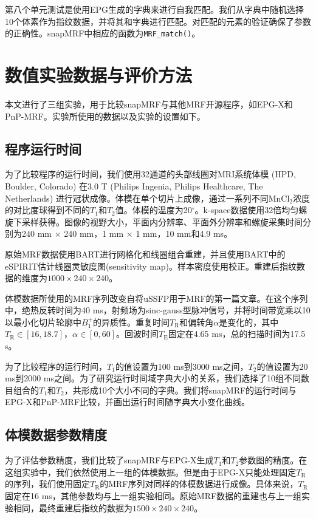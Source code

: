 第八个单元测试是使用EPG生成的字典来进行自我匹配。我们从字典中随机选择10个体素作为指纹数据，并将其和字典进行匹配。对匹配的元素的验证确保了参数的正确性。snapMRF中相应的函数为\texttt{MRF\_match()}。

\section{数值实验数据与评价方法}
本文进行了三组实验，用于比较snapMRF与其他MRF开源程序，如EPG-X和PnP-MRF。实验所使用的数据以及实验的设置如下。

\subsection{程序运行时间}
为了比较程序的运行时间，我们使用32通道的头部线圈对MRI系统体模 \cite{keenan_comparison_2016} (HPD, Boulder, Colorado) 在3.0 T (Philips Ingenia, Philips Healthcare, The Netherlands) 进行冠状成像。体模在单个切片上成像，通过一系列不同MnCl$_2$浓度的对比度球得到不同的$T_1$和$T_2$值。体模的温度为20$^{\circ}$。k-space数据使用32倍均匀螺旋下采样获得\cite{pipe_spiral_2014}。图像的视野大小，平面内分辨率、平面外分辨率和螺旋采集时间分别为240 mm $\times$ 240 mm，1 mm $\times$ 1 mm，10 mm和4.9 ms。

原始MRF数据使用BART\cite{bart}进行网格化和线圈组合重建，并且使用BART中的eSPIRIT估计线圈灵敏度图(sensitivity map)。样本密度使用\cite{zwart_sdc_2012}校正。重建后指纹数据的维度为$1000 \times 240 \times 240$。

体模数据所使用的MRF序列改变自将uSSFP用于MRF的第一篇文章\cite{jiang}。在这个序列中，绝热反转时间为40 ms，射频场为sinc-gauss型脉冲信号，并将时间带宽乘以10以最小化切片轮廓中$B_1^+$的异质性。重复时间$T_\mathrm{R}$和偏转角$\alpha$是变化的，其中$T_\mathrm{R}\in [16,18.7]$，$\alpha \in [0,60]$。回波时间$T_\mathrm{E}$固定在4.65 ms，总的扫描时间为17.5 s。

为了比较程序的运行时间，$T_1$的值设置为100 ms到3000 ms之间，$T_2$的值设置为20 ms到2000 ms之间。为了研究运行时间域字典大小的关系，我们选择了10组不同数目组合的$T_1$和$T_2$，共形成10个大小不同的字典。我们将snapMRF的运行时间与EPG-X\cite{malik_extended_2018}和PnP-MRF\cite{cloos2016multiparametric}比较，并画出运行时间随字典大小变化曲线。

\subsection{体模数据参数精度}
为了评估参数精度，我们比较了snapMRF与EPG-X生成$T_1$和$T_2$参数图的精度。在这组实验中，我们依然使用上一组的体模数据。但是由于EPG-X只能处理固定$T_\mathrm{R}$的序列，我们使用固定$T_\mathrm{R}$的MRF序列对同样的体模数据进行成像。具体来说，$T_\mathrm{R}$固定在16 ms，其他参数均与上一组实验相同。原始MRF数据的重建也与上一组实验相同，最终重建后指纹的数据为$1500 \times 240 \times 240$。


